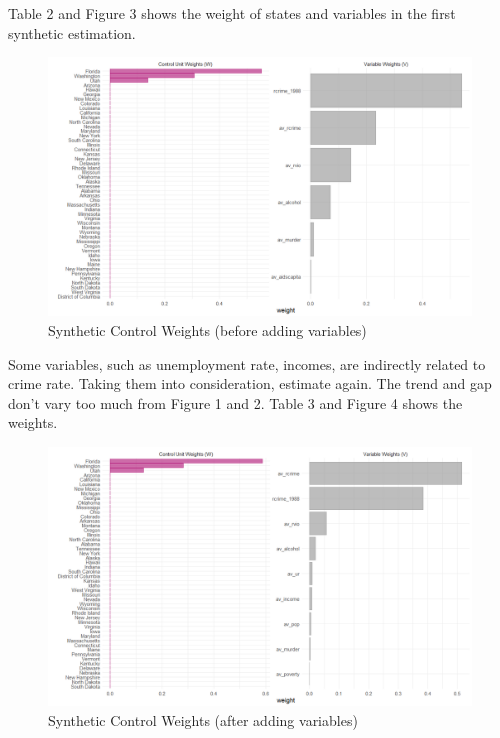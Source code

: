 \documentclass{article}
\begin{document}
Table 2 and Figure 3 shows the weight of states and variables in the first synthetic estimation.



\begin{figure}[H]
    \begin{center}
        \includegraphics[width=.85\textwidth]{Figures/figure_3.png}
    \end{center}
    \caption{Synthetic Control Weights (before adding variables)}
    \label{fig:graph}
\end{figure}

Some variables, such as unemployment rate, incomes, are indirectly related to crime rate. Taking them into consideration, estimate again. The trend and gap don't vary too much from Figure 1 and 2. Table 3 and Figure 4 shows the weights. 



\begin{figure}[H]
    \begin{center}
        \includegraphics[width=.85\textwidth]{Figures/figure_4.png}
    \end{center}
    \caption{Synthetic Control Weights (after adding variables)}
    \label{fig:graph}
\end{figure}
\end{document}
